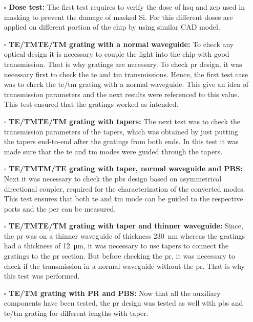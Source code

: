 \documentclass[../report.tex]{subfiles}
\begin{document}
	\begin{itemize}[leftmargin=*]
		\item[$\square$] \textbf{Dose test:} The first test requires to verify the dose of \gls{hsq} and \gls{zep} used in masking to prevent the damage of masked Si. For this different doses are applied on different portion of the chip by using similar CAD model.
		
		\item[$\square$] \textbf{TE/TM\textemdash TE/TM grating with a normal waveguide:} To check any optical design it is necessary to couple the light into the chip with good transmission. That is why gratings are necessary. To check \gls{pr} design, it was necessary first to check the \gls{te} and \gls{tm} transmissions. Hence, the first test case was to check the \gls{te}/\gls{tm} grating with a normal waveguide. This give an idea of transmission parameters and the next results were referenced to this value. This test ensured that the gratings worked as intended. 
		
		\item[$\square$] \textbf{TE/TM\textemdash TE/TM grating with tapers:} The next test was to check the transmission parameters of the tapers, which was obtained by just putting the tapers end-to-end after the gratings from both ends. In this test it was made sure that the \gls{te} and \gls{tm} modes were guided through the tapers.
		
		\item[$\square$] \textbf{TE/TM\textemdash TM/TE grating with taper, normal waveguide and PBS:} Next it was necessary to check the \gls{pbs} design based on asymmetrical directional coupler, required for the characterization of the converted modes. This test ensures that both \gls{te} and \gls{tm} mode can be guided to the respective ports and the \gls{per} can be measured.
		
		\item[$\square$] \textbf{TE/TM\textemdash TE/TM grating with taper and thinner waveguide:} Since, the \gls{pr} was on a thinner waveguide of thickness \SI{230}{\nano \meter} whereas the gratings had a thickness of \SI{12}{\micro \meter}, it was necessary to use tapers to connect the gratings to the \gls{pr} section. But before checking the \gls{pr}, it was necessary to check if the transmission in a normal waveguide without the \gls{pr}. That is why this test was performed. 
		
		\item[$\square$] \textbf{TE/TM grating with PR and PBS:} Now that all the auxiliary components have been tested, the \gls{pr} design was tested as well with \gls{pbs} and \gls{te}/\gls{tm} grating for different lengths with taper.
		

\end{itemize}
\end{document}
